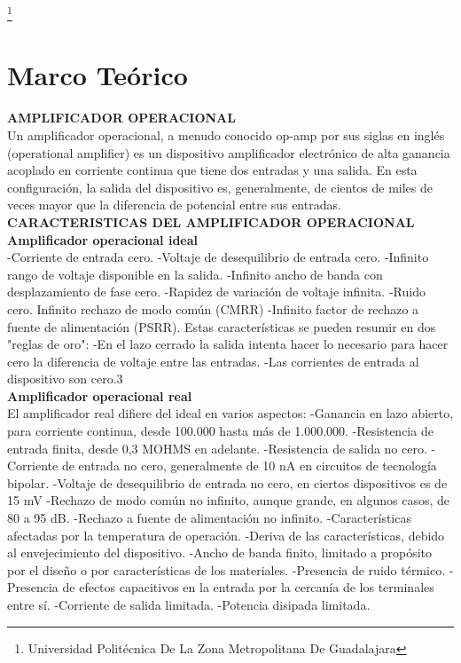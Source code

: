 \documentclass[10pt,a4paper]{article}
\begin{document}
\footnote{Universidad Politécnica De La Zona Metropolitana De Guadalajara} 

\newpage

\section{Marco Teórico}
\textbf{AMPLIFICADOR OPERACIONAL}\\
Un amplificador operacional, a menudo conocido op-amp por sus siglas en inglés (operational amplifier) es un dispositivo amplificador electrónico de alta ganancia acoplado en corriente continua que tiene dos entradas y una salida. En esta configuración, la salida del dispositivo es, generalmente, de cientos de miles de veces mayor que la diferencia de potencial entre sus entradas.\\

\textbf{CARACTERISTICAS DEL AMPLIFICADOR OPERACIONAL}\\

\textbf{Amplificador operacional ideal}\\
-Corriente de entrada cero.
-Voltaje de desequilibrio de entrada cero.
-Infinito rango de voltaje disponible en la salida.
-Infinito ancho de banda con desplazamiento de fase cero.
-Rapidez de variación de voltaje infinita.
-Ruido cero.
Infinito rechazo de modo común (CMRR)
-Infinito factor de rechazo a fuente de alimentación (PSRR).
Estas características se pueden resumir en dos "reglas de oro":
-En el lazo cerrado la salida intenta hacer lo necesario para hacer cero la diferencia de voltaje entre las entradas.
-Las corrientes de entrada al dispositivo son cero.3\\

\textbf{Amplificador operacional real}\\
El amplificador real difiere del ideal en varios aspectos:
-Ganancia en lazo abierto, para corriente continua, desde 100.000 hasta más de 1.000.000.
-Resistencia de entrada finita, desde 0,3 MOHMS en adelante.
-Resistencia de salida no cero.
-Corriente de entrada no cero, generalmente de 10 nA en circuitos de tecnología bipolar.
-Voltaje de desequilibrio de entrada no cero, en ciertos dispositivos es de 15 mV
-Rechazo de modo común no infinito, aunque grande, en algunos casos, de 80 a 95 dB.
-Rechazo a fuente de alimentación no infinito.
-Características afectadas por la temperatura de operación.
-Deriva de las características, debido al envejecimiento del dispositivo.
-Ancho de banda finito, limitado a propósito por el diseño o por características de los materiales.
-Presencia de ruido térmico.
-Presencia de efectos capacitivos en la entrada por la cercanía de los terminales entre sí.
-Corriente de salida limitada.
-Potencia disipada limitada.\\
\end{document}
